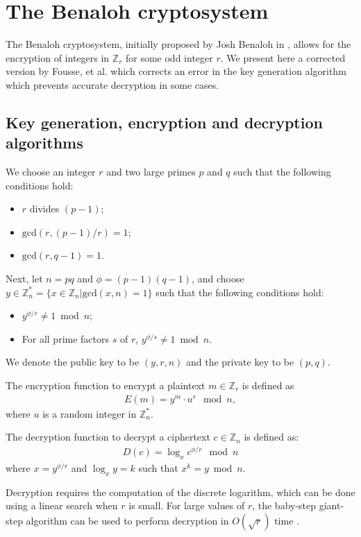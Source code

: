 \section{The Benaloh cryptosystem}
The Benaloh cryptosystem, initially proposed by Josh Benaloh in \cite{benaloh_dense_1994}, allows for the encryption of integers in $\mathbb{Z}_r$ for some odd integer $r$. We present here a corrected version by Fousse, et al. \cite{fousse_benalohs_2010} which corrects an error in the key generation algorithm which prevents accurate decryption in some cases.

\subsection{Key generation, encryption and decryption algorithms}
We choose an integer $r$ and two large primes $p$ and $q$ such that the following conditions hold:
\begin{itemize}
  \item $r$ divides $(p-1)$;
  \item $\mathrm{gcd}(r,(p-1)/r)=1$;
  \item $\mathrm{gcd}(r,q-1)=1$.
\end{itemize}
Next, let $n=pq$ and $\phi = (p-1)(q-1)$, and choose $y\in \mathbb{Z}_n^* = \{ x \in \mathbb{Z}_n | \mathrm{gcd}(x,n)=1 \}$ such that the following conditions hold:
\begin{itemize}
  \item $y^{\phi/r}\neq 1 \bmod n$;
  \item For all prime factors $s$ of $r$, $y^{\phi/s}\neq 1 \bmod n$.
\end{itemize}
We denote the public key to be $(y,r,n)$ and the private key to be $(p,q)$.

The encryption function to encrypt a plaintext $m \in \mathbb{Z}_r$ is defined as
\begin{align*}
  E(m) = y^m \cdot u^r \mod{n},
\end{align*}
where $u$ is a random integer in $\mathbb{Z}_n^*$.

The decryption function to decrypt a ciphertext $c \in \mathbb{Z}_{n}$ is defined as:
\begin{align*}
  D(c) = \log_x{c^{\phi/r}} \mod n
\end{align*}
where $x = y^{\phi/r}$ and $\log_x{y} = k$ such that $x^k = y \bmod n$.

Decryption requires the computation of the discrete logarithm, which can be done using a linear search when $r$ is small. For large values of $r$, the baby-step giant-step algorithm can be used to perform decryption in $O(\sqrt{r})$ time \cite{benaloh_dense_1994}.

